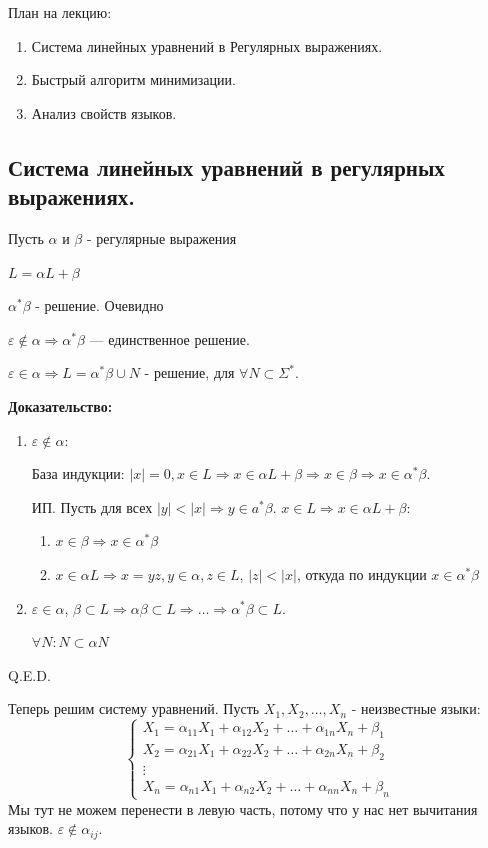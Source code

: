 План на лекцию:
\begin{enumerate}
    \item Система линейных уравнений в Регулярных выражениях.
    \item Быстрый алгоритм минимизации.
    \item Анализ свойств языков.
\end{enumerate}

\subsection{Система линейных уравнений в регулярных выражениях.}

Пусть $\alpha$ и $\beta$ - регулярные выражения

$L = \alpha L + \beta $

 $\alpha^*\beta$ - решение. Очевидно


$\varepsilon \not \in \alpha \Rightarrow \alpha^*\beta $ --- единственное решение.

$\varepsilon \in \alpha \Rightarrow L = \alpha^*\beta \cup N$ - решение, для $\forall N \subset \Sigma^*$.

\textbf{Доказательство:}
\begin{enumerate}
    \item $\varepsilon \not \in \alpha$:

    База индукции: $|x|= 0, x \in L \Rightarrow x\in \alpha L+\beta \Rightarrow x\in \beta \Rightarrow x\in \alpha^* \beta$.

    ИП. Пусть для всех $|y|<|x| \Rightarrow y \in a^*\beta$.   $x\in L \Rightarrow x\in\alpha L + \beta:$ 
    \begin{enumerate}
        \item $x\in \beta \Rightarrow x\in \alpha^* \beta$
        \item $x \in \alpha L \Rightarrow 
        x = yz,y\in \alpha, z \in L$, $|z|<|x|$, откуда по индукции $x\in \alpha^* \beta$
    \end{enumerate}
    \item $\varepsilon \in \alpha$, $\beta \subset L \Rightarrow \alpha \beta \subset L \Rightarrow \ldots \Rightarrow \alpha^* \beta \subset L$.

    $\forall N: N \subset \alpha N$
\end{enumerate}

\hfill Q.E.D.

Теперь решим систему уравнений. Пусть $X_1,X_2,\ldots, X_n$ - неизвестные языки:
$$\begin{cases}
    X_1 = \alpha_{11}X_1 + \alpha_{12}X_2 + \ldots + \alpha_{1n}X_n  + \beta_1\\
    X_2 = \alpha_{21}X_1 + \alpha_{22}X_2 + \ldots + \alpha_{2n}X_n + \beta_2
\\
\vdots \\
X_n = \alpha_{n1}X_1 + \alpha_{n2}X_2 + \ldots +\alpha_{nn}X_n + \beta_n
\end{cases}$$
Мы тут не можем перенести в левую часть, потому что у нас нет вычитания языков. $\varepsilon \not \in \alpha_{ij}$.


